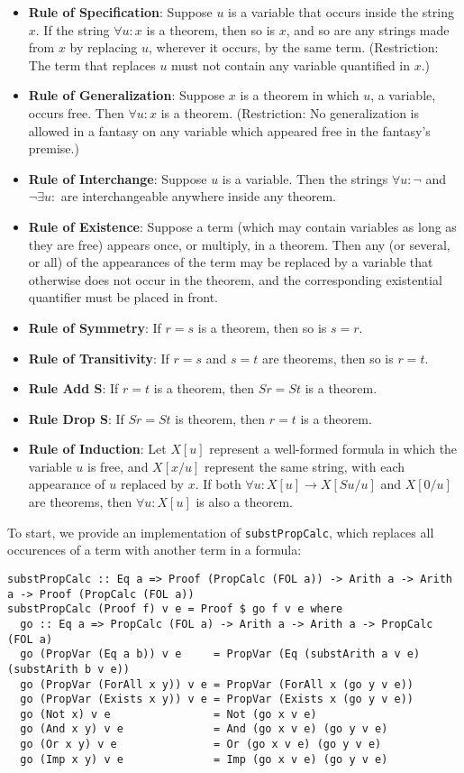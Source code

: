 \documentclass{article}
\begin{document}
\begin{itemize}
\item \textbf{Rule of Specification}: Suppose $u$ is a variable that occurs inside the string $x$. If the string $\forall u:x$ is a theorem, then so is $x$, and so are any strings made from $x$ by replacing $u$, wherever it occurs, by the same term. (Restriction: The term that replaces $u$ must not contain any variable quantified in $x$.)
\item \textbf{Rule of Generalization}: Suppose $x$ is a theorem in which $u$, a variable, occurs free. Then $\forall u:x$ is a theorem. (Restriction: No generalization is allowed in a fantasy on any variable which appeared free in the fantasy's premise.)
\item \textbf{Rule of Interchange}: Suppose $u$ is a variable. Then the strings $\forall u:\neg$ and $\neg \exists u:$ are interchangeable anywhere inside any theorem.
\item \textbf{Rule of Existence}: Suppose a term (which may contain variables as long as they are free) appears once, or multiply, in a theorem. Then any (or several, or all) of the appearances of the term may be replaced by a variable that otherwise does not occur in the theorem, and the corresponding existential quantifier must be placed in front.
\item \textbf{Rule of Symmetry}: If $r=s$ is a theorem, then so is $s=r$.
\item \textbf{Rule of Transitivity}: If $r=s$ and $s=t$ are theorems, then so is $r=t$.
\item \textbf{Rule Add S}: If $r=t$ is a theorem, then $Sr=St$ is a theorem.
\item \textbf{Rule Drop S}: If $Sr=St$ is theorem, then $r=t$ is a theorem.
\item \textbf{Rule of Induction}: Let $X[u]$ represent a well-formed formula in which the variable $u$ is free, and $X[x/u]$ represent the same string, with each appearance of $u$ replaced by $x$. If both $\forall u:X[u] \to X[Su/u]$ and $X[0/u]$ are theorems, then $\forall u:X[u]$ is also a theorem.
\end{itemize}

To start, we provide an implementation of \texttt{substPropCalc}, which replaces all occurences of a term with another term in a formula:

\begin{lstlisting}
substPropCalc :: Eq a => Proof (PropCalc (FOL a)) -> Arith a -> Arith a -> Proof (PropCalc (FOL a))
substPropCalc (Proof f) v e = Proof $ go f v e where
  go :: Eq a => PropCalc (FOL a) -> Arith a -> Arith a -> PropCalc (FOL a)
  go (PropVar (Eq a b)) v e     = PropVar (Eq (substArith a v e) (substArith b v e))
  go (PropVar (ForAll x y)) v e = PropVar (ForAll x (go y v e))
  go (PropVar (Exists x y)) v e = PropVar (Exists x (go y v e))
  go (Not x) v e                = Not (go x v e)
  go (And x y) v e              = And (go x v e) (go y v e)
  go (Or x y) v e               = Or (go x v e) (go y v e)
  go (Imp x y) v e              = Imp (go x v e) (go y v e)
\end{lstlisting}
\end{document}
